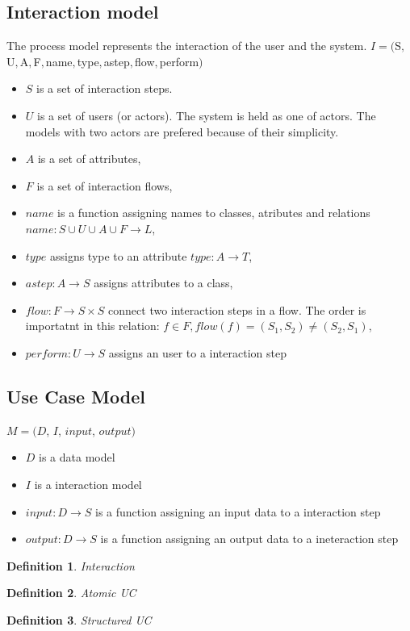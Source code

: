 \documentclass[10pt,a4paper]{article}
\newtheorem{mydef}{Definition}
\begin{document}
\subsection{Interaction model}
The process model represents the interaction of the user and the system.
$I=($S$, $U$, $A$, $F$, $name$, $type$, $astep$, $flow$, $perform$)$
\begin{itemize}
	\item $S$ is a set of interaction steps.
	\item $U$ is a set of users (or actors). The system is held as one of actors. The models with two actors are prefered because of their simplicity. 
	\item $A$ is a set of attributes,
	\item $F$ is a set of interaction flows,
	\item $name$ is a function assigning names to classes, atributes and relations $name: S \cup U \cup A \cup F \rightarrow L$,
	\item $type$ assigns type to an attribute $type: A \rightarrow T$,
	\item $astep: A \rightarrow S$ assigns attributes to a class,
	\item $flow: F \rightarrow S \times S$ connect two interaction steps in a flow. The order is importatnt in this relation: $f \in F, flow(f)=(S_1, S_2)\neq(S_2, S_1)$,
	\item $perform: U \rightarrow S$ assigns an user to a interaction step 
\end{itemize}


\subsection{Use Case Model}

$M = (D$, $I$, $input$, $output)$
\begin{itemize}
	\item $D$ is a data model
	\item $I$ is a interaction model
	\item $input: D \rightarrow S$ is a function assigning an input data to a interaction step
	\item $output: D \rightarrow S$ is a function assigning an output data to a ineteraction step
\end{itemize}

\begin{mydef}
Interaction
\end{mydef}

\begin{mydef}
Atomic UC
\end{mydef}

\begin{mydef}
Structured UC
\end{mydef}
\end{document}
